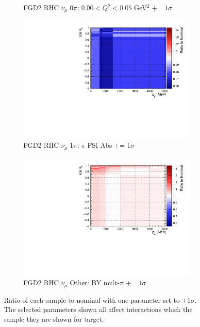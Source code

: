 \begin{figure}
\begin{subfigure}{.32\textwidth}
  \caption{FGD2 RHC $\nu_{\mu}$ 0$\pi$: $0.00 < Q^2 < 0.05$ GeV$^2$ += $1\sigma$}
  \label{fig:sigvar_FGD2_NuMuBkg_CC0pi_in_AntiNu_Mode}
\end{subfigure}
\begin{subfigure}{.32\textwidth}
  \centering
  \includegraphics[width=0.85\linewidth]{figs/sig/FGD2_NuMuBkg_CC1pi_in_AntiNu_Mode_FEFABS_+1sig.pdf}
  \caption{FGD2 RHC $\nu_{\mu}$ 1$\pi$: $\pi$ FSI Abs += $1\sigma$}
  \label{fig:sigvar_FGD2_NuMuBkg_CC1pi_in_AntiNu_Mode}
\end{subfigure}
\begin{subfigure}{.32\textwidth}
  \centering
  \includegraphics[width=0.85\linewidth]{figs/sig/FGD2_NuMuBkg_CCOther_in_AntiNu_Mode_CC_BY_MPi_+1sig.pdf}
  \caption{FGD2 RHC $\nu_{\mu}$ Other: BY mult-$\pi$ += $1\sigma$}
  \label{fig:sigvar_FGD2_NuMuBkg_CCOther_in_AntiNu_Mode}
\end{subfigure}
\caption{Ratio of each sample to nominal with one parameter set to $+1\sigma$. The selected parameters shown all affect interactions which the sample they are shown for target.}
\label{fig:sigvars}
\end{figure}

